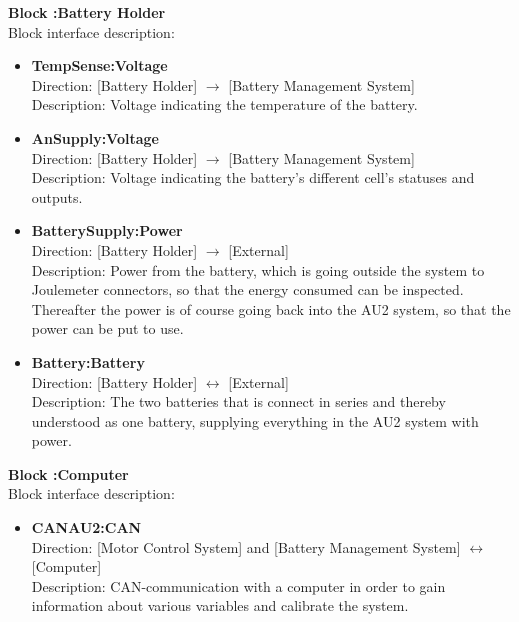 \textbf{Block :Battery Holder}\\
Block interface description:
\begin{itemize}
	\item \textbf{TempSense:Voltage}\\
	Direction: [Battery Holder] $\rightarrow$ [Battery Management System]\\
	Description: Voltage indicating the temperature of the battery.
	\item \textbf{AnSupply:Voltage}\\
	Direction: [Battery Holder] $\rightarrow$ [Battery Management System]\\
	Description: Voltage indicating the battery's different cell's statuses and outputs.
	\item \textbf{BatterySupply:Power}\\
	Direction: [Battery Holder] $\rightarrow$ [External]\\
	Description: Power from the battery, which is going outside the system to Joulemeter connectors, so that the energy consumed can be inspected. Thereafter the power is of course going back into the AU2 system, so that the power can be put to use.
	\item \textbf{Battery:Battery}\\
	Direction: [Battery Holder] $\leftrightarrow$ [External]\\
	Description: The two batteries that is connect in series and thereby understood as one battery, supplying everything in the AU2 system with power.
\end{itemize}

\textbf{Block :Computer}\\
Block interface description:
\begin{itemize}
	\item \textbf{CANAU2:CAN}\\
	Direction: [Motor Control System] and [Battery Management System] $\leftrightarrow$ [Computer]\\
	Description: CAN-communication with a computer in order to gain information about various variables and calibrate the system.
\end{itemize}